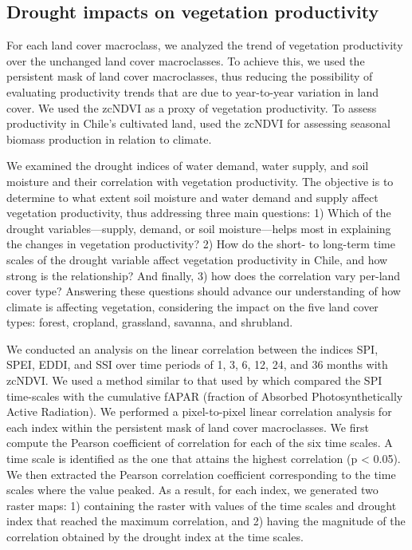 \documentclass[
  authoryear,
  preprint,
  3p,
  onecolumn]{elsarticle}
\begin{document}
\hypertarget{drought-impacts-on-vegetation-productivity}{%
\subsection{Drought impacts on vegetation
productivity}\label{drought-impacts-on-vegetation-productivity}}

For each land cover macroclass, we analyzed the trend of vegetation
productivity over the unchanged land cover macroclasses. To achieve
this, we used the persistent mask of land cover macroclasses, thus
reducing the possibility of evaluating productivity trends that are due
to year-to-year variation in land cover. We used the zcNDVI as a proxy
of vegetation productivity. To assess productivity in Chile's cultivated
land, \citet{Zambrano2018} used the zcNDVI for assessing seasonal
biomass production in relation to climate.

We examined the drought indices of water demand, water supply, and soil
moisture and their correlation with vegetation productivity. The
objective is to determine to what extent soil moisture and water demand
and supply affect vegetation productivity, thus addressing three main
questions: 1) Which of the drought variables---supply, demand, or soil
moisture---helps most in explaining the changes in vegetation
productivity? 2) How do the short- to long-term time scales of the
drought variable affect vegetation productivity in Chile, and how strong
is the relationship? And finally, 3) how does the correlation vary
per-land cover type? Answering these questions should advance our
understanding of how climate is affecting vegetation, considering the
impact on the five land cover types: forest, cropland, grassland,
savanna, and shrubland.

We conducted an analysis on the linear correlation between the indices
SPI, SPEI, EDDI, and SSI over time periods of 1, 3, 6, 12, 24, and 36
months with zcNDVI. We used a method similar to that used by
\citet{Meroni2017} which compared the SPI time-scales with the
cumulative fAPAR (fraction of Absorbed Photosynthetically Active
Radiation). We performed a pixel-to-pixel linear correlation analysis
for each index within the persistent mask of land cover macroclasses. We
first compute the Pearson coefficient of correlation for each of the six
time scales. A time scale is identified as the one that attains the
highest correlation (p \textless{} 0.05). We then extracted the Pearson
correlation coefficient corresponding to the time scales where the value
peaked. As a result, for each index, we generated two raster maps: 1)
containing the raster with values of the time scales and drought index
that reached the maximum correlation, and 2) having the magnitude of the
correlation obtained by the drought index at the time scales.
\end{document}
